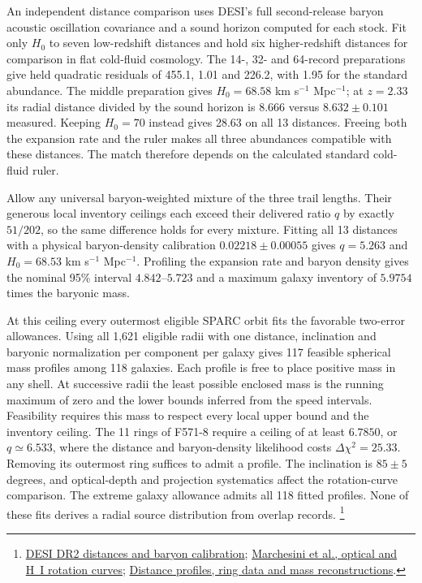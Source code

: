\documentclass[11pt]{article}
\begin{document}
An independent distance comparison uses DESI's full second-release
baryon acoustic oscillation covariance and a sound horizon computed for
each stock. Fit only $H_0$ to seven low-redshift distances and hold six
higher-redshift distances for comparison in flat cold-fluid cosmology.
The 14-, 32- and 64-record preparations give held quadratic residuals of
455.1, 1.01 and 226.2, with 1.95 for the standard abundance. The middle
preparation gives $H_0=68.58$ km s$^{-1}$ Mpc$^{-1}$; at $z=2.33$ its
radial distance divided by the sound horizon is 8.666 versus
$8.632\pm0.101$ measured. Keeping $H_0=70$ instead gives 28.63 on all
13 distances. Freeing both the expansion rate and the ruler makes all
three abundances compatible with these distances. The match therefore
depends on the calculated standard cold-fluid ruler.

Allow any universal baryon-weighted mixture of the three trail lengths.
Their generous local inventory ceilings each exceed their delivered
ratio $q$ by exactly $51/202$, so the same difference holds for every
mixture. Fitting all 13 distances with a physical baryon-density
calibration $0.02218\pm0.00055$ gives $q=5.263$ and
$H_0=68.53$ km s$^{-1}$ Mpc$^{-1}$. Profiling the expansion rate and
baryon density gives the nominal 95\% interval $4.842$--$5.723$ and a
maximum galaxy inventory of $5.9754$ times the baryonic mass.

At this ceiling every outermost eligible SPARC orbit fits the favorable
two-error allowances. Using all 1,621 eligible radii with one distance,
inclination and baryonic normalization per component per galaxy gives
117 feasible spherical mass profiles among 118 galaxies. Each profile
is free to place positive mass in any shell. At successive radii the
least possible enclosed mass is the running maximum of zero and the
lower bounds inferred from the speed intervals. Feasibility requires
this mass to respect every local upper bound and the inventory ceiling.
The 11 rings of F571-8 require a ceiling of at least $6.7850$, or
$q\simeq6.533$, where the distance and baryon-density likelihood costs
$\Delta\chi^2=25.33$. Removing its outermost ring suffices to admit
a profile. The inclination is $85\pm5$ degrees, and optical-depth and
projection systematics affect the rotation-curve comparison. The extreme
galaxy allowance admits all 118 fitted profiles. None of these fits
derives a radial source distribution from overlap records.%
\footnote{\href{https://arxiv.org/abs/2503.14738}{DESI DR2 distances and baryon calibration};
\href{https://arxiv.org/abs/astro-ph/0202075}{Marchesini et al., optical and H~I rotation curves};
\href{https://github.com/FloatingPragma/observer-patch-holography/tree/main/code/cosmology/paid_trail_bao}{Distance profiles, ring data and mass reconstructions}.}
\end{document}
